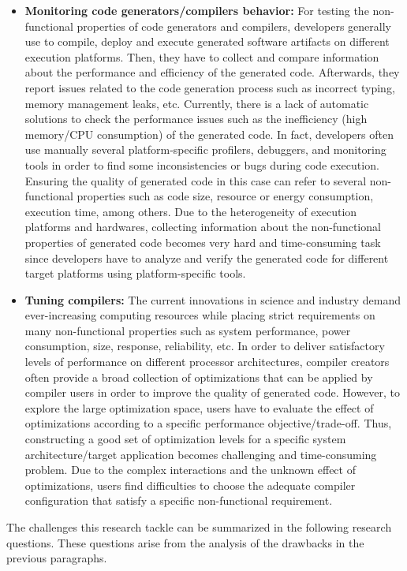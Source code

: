 \begin{itemize}
\item
\textbf{Monitoring code generators/compilers behavior:} For testing the non-functional properties of code generators and compilers, developers generally use to compile, deploy and execute generated software artifacts on different execution platforms. Then, they have to collect and compare information about the performance and efficiency of the generated code. Afterwards, they report issues related to the code generation process such as incorrect typing, memory management leaks, etc.
Currently, there is a lack of automatic solutions to check the performance issues such as the inefficiency (high memory/CPU consumption) of the generated code. In fact, developers often use manually several platform-specific profilers, debuggers, and monitoring tools\cite{guana2014chaintracker,delgado2004taxonomy} in order to find some inconsistencies or bugs during code execution. Ensuring the quality of generated code in this case can refer to several non-functional properties such as code size, resource or energy consumption, execution time, among others\cite{pan2006fast}. Due to the heterogeneity of execution platforms and hardwares, collecting information about the non-functional properties of generated code becomes very hard and time-consuming task since developers have to analyze and verify the generated code for different target platforms using platform-specific tools. 
\item
\textbf{Tuning compilers:} The current innovations in science and industry demand ever-increasing computing resources while placing strict requirements on many non-functional properties such as system performance, power consumption, size, response, reliability, etc. In order to deliver satisfactory levels of performance on different processor architectures, compiler creators often provide a broad collection of optimizations that can be applied by compiler users in order to improve the quality of generated code. However, to explore the large optimization space, users have to evaluate the effect of optimizations according to a specific performance objective/trade-off. Thus, constructing a good set of optimization levels for a specific system architecture/target application becomes challenging and time-consuming problem. Due to the complex interactions and the unknown effect of optimizations, users find difficulties to choose the adequate compiler configuration that satisfy a specific non-functional requirement.





 


\end{itemize}
The challenges this research tackle can be summarized in the following research questions. These questions arise from the analysis of the drawbacks in the previous paragraphs.

